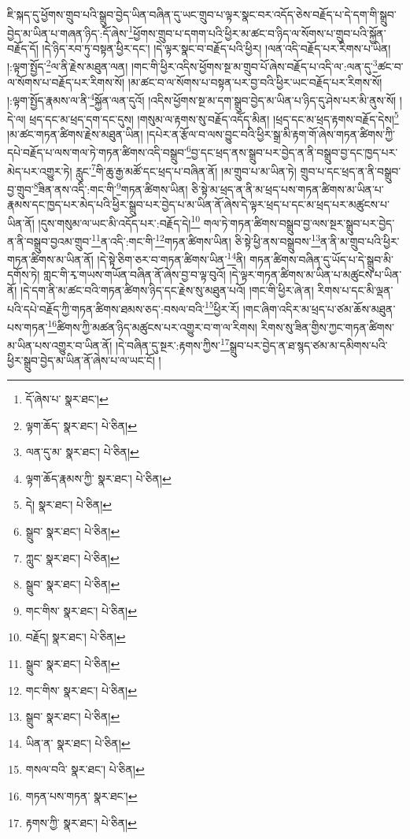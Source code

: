 ཇི་སྐད་དུ་ཕྱོགས་གྲུབ་པའི་སྒྲུབ་བྱེད་ཡིན་བཞིན་དུ་ཡང་གྲུབ་པ་ལྟར་སྣང་བར་འདོད་ཅེས་བརྗོད་པ་དེ་དག་གི་སྒྲུབ་བྱེད་མ་ཡིན་པ་གཞན་ཉིད་:དོ་ཞེས་\footnote{དོ་ཞེས་པ་  སྣར་ཐང་། }ཕྱོགས་གྲུབ་པ་དགག་པའི་ཕྱིར་མ་ཚང་བ་ཉིད་ལ་སོགས་པ་གྲུབ་པའི་སྐྱོན་བརྗོད་དོ། །དེ་ཉིད་རབ་ཏུ་བསྟན་ཕྱིར་དང་། །དེ་ལྟར་སྣང་བ་བརྗོད་པའི་ཕྱིར། །ལན་འདི་བརྗོད་པར་རིགས་པ་ཡིན། །:ལྟག་སྤྱོད་\footnote{ལྟག་ཆོད་  སྣར་ཐང་།  པེ་ཅིན། }ལ་ནི་རྗེས་མཐུན་ལན། །གང་གི་ཕྱིར་འདིས་ཕྱོགས་སྔ་མ་གྲུབ་པོ་ཞེས་བརྗོད་པ་འདི་ལ་:ལན་དུ་\footnote{ལན་དུ་མ་  སྣར་ཐང་།  པེ་ཅིན། }ཚང་བ་ལ་སོགས་པ་བརྗོད་པར་རིགས་སོ། །མ་ཚང་བ་ལ་སོགས་པ་བསྟན་པར་བྱ་བའི་ཕྱིར་ཡང་བརྗོད་པར་རིགས་སོ། །:ལྟག་སྤྱོད་རྣམས་ལ་ནི་\footnote{ལྟག་ཆོད་རྣམས་ཀྱི་  སྣར་ཐང་།  པེ་ཅིན། }སྐྱོན་ལན་དུའོ། །འདིས་ཕྱོགས་སྔ་མ་དག་སྒྲུབ་བྱེད་མ་ཡིན་པ་ཉིད་དུ་ཤེས་པར་མི་ནུས་སོ། །དེ་ལ། ཕྲད་དང་མ་ཕྲད་དག་དང་དུས། །གསུམ་ལ་རྟགས་སུ་བརྗོད་འདོད་མིན། །ཕྲད་དང་མ་ཕྲད་རྟགས་བརྗོད་དེས།\footnote{དེ།  སྣར་ཐང་།  པེ་ཅིན། } །མ་ཚང་གཏན་ཚིགས་རྗེས་མཐུན་ཡིན། །དཔེར་ན་རྩོལ་བ་ལས་བྱུང་བའི་ཕྱིར་སྒྲ་མི་རྟག་གོ་ཞེས་གཏན་ཚིགས་ཀྱི་དཔེ་བརྗོད་པ་ལས་གལ་ཏེ་གཏན་ཚིགས་འདི་བསྒྲུབ་\footnote{སྒྲུབ་  སྣར་ཐང་།  པེ་ཅིན། }བྱ་དང་ཕྲད་ནས་སྒྲུབ་པར་བྱེད་ན་ནི་བསྒྲུབ་བྱ་དང་ཁྱད་པར་མེད་པར་འགྱུར་ཏེ། རླུང་\footnote{ཀླུང་  སྣར་ཐང་།  པེ་ཅིན། }གི་ཆུ་རྒྱ་མཚོ་དང་ཕྲད་པ་བཞིན་ནོ། །མ་གྲུབ་པ་མ་ཡིན་ཏེ། གྲུབ་པ་དང་ཕྲད་ན་ནི་བསྒྲུབ་བྱ་གྲུབ་\footnote{སྒྲུབ་  སྣར་ཐང་།  པེ་ཅིན། }ཟིན་ནས་འདི་:གང་གི་\footnote{གང་གིས་  སྣར་ཐང་།  པེ་ཅིན། }གཏན་ཚིགས་ཡིན། ཅི་སྟེ་མ་ཕྲད་ན་ནི་མ་ཕྲད་པས་གཏན་ཚིགས་མ་ཡིན་པ་རྣམས་དང་ཁྱད་པར་མེད་པའི་ཕྱིར་སྒྲུབ་པར་བྱེད་པ་མ་ཡིན་ནོ་ཞེས་དེ་ལྟར་ཕྲད་པ་དང་མ་ཕྲད་པར་མཚུངས་པ་ཡིན་ནོ། །དུས་གསུམ་ལ་ཡང་མི་འདོད་པར་:བརྗོད་དེ།\footnote{བརྗོད།  སྣར་ཐང་།  པེ་ཅིན། } གལ་ཏེ་གཏན་ཚིགས་བསྒྲུབ་བྱ་ལས་སྔར་སྒྲུབ་པར་བྱེད་ན་ནི་བསྒྲུབ་བྱའམ་གྲུབ་\footnote{སྒྲུབ་  སྣར་ཐང་།  པེ་ཅིན། }ན་འདི་:གང་གི་\footnote{གང་གིས་  སྣར་ཐང་།  པེ་ཅིན། }གཏན་ཚིགས་ཡིན། ཅི་སྟེ་ཕྱི་ནས་བསྒྲུབས་\footnote{སྒྲུབ་  སྣར་ཐང་།  པེ་ཅིན། }ན་ནི་མ་གྲུབ་པའི་ཕྱིར་གཏན་ཚིགས་མ་ཡིན་ནོ། །དེ་སྟེ་ཅིག་ཅར་བ་གཏན་ཚིགས་ཡིན་\footnote{ཡིན་ན་  སྣར་ཐང་།  པེ་ཅིན། }ནི། གཏན་ཚིགས་བཞིན་དུ་ཡོད་པ་དེ་སྒྲུབ་མི་དགོས་ཏེ། གླང་གི་རྭ་གཡས་གཡོན་བཞིན་ནོ་ཞེས་བྱ་བ་ལྟ་བུའོ། །དེ་ལྟར་གཏན་ཚིགས་མ་ཡིན་པ་མཚུངས་པ་ཡིན་ནོ། །དེ་དག་ནི་མ་ཚང་བའི་གཏན་ཚིགས་ཉིད་དང་རྗེས་སུ་མཐུན་པའོ། །གང་གི་ཕྱིར་ཞེ་ན། རིགས་པ་དང་མི་ལྡན་པའི་དཔེ་བརྗོད་ཀྱི་གཏན་ཚིགས་ཐམས་ཅད་:བསལ་བའི་\footnote{གསལ་བའི་  སྣར་ཐང་།  པེ་ཅིན། }ཕྱིར་རོ། །གང་ཞིག་འདིར་མ་ཕྲད་པ་ཙམ་ཆོས་མཐུན་པས་གཏན་\footnote{གཏན་པས་གཏན་  སྣར་ཐང་། }ཚིགས་ཀྱི་མཚན་ཉིད་མཚུངས་པར་འགྱུར་བ་ག་ལ་རིགས། རིགས་སུ་ཟིན་གྱིས་ཀྱང་གཏན་ཚིགས་མ་ཡིན་པས་འགྱུར་བ་ཡིན་ནོ། །དེ་བཞིན་དུ་སྔར་:རྟགས་ཀྱིས་\footnote{རྟགས་ཀྱི་  སྣར་ཐང་།  པེ་ཅིན། }སྒྲུབ་པར་བྱེད་ན་ཐ་སྙད་ཙམ་མ་དམིགས་པའི་ཕྱིར་སྒྲུབ་བྱེད་མ་ཡིན་ནོ་ཞེས་པ་ལ་ཡང་ངོ། །
